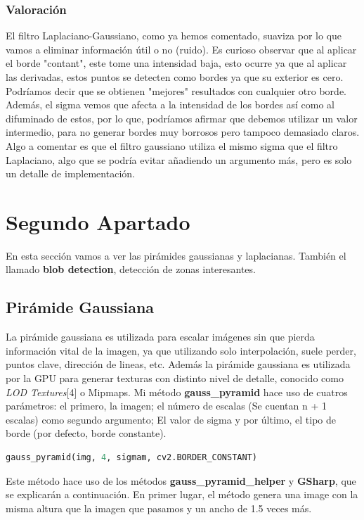 \documentclass{article}
\begin{document}
\newpage

\subsubsection{Valoración}
El filtro Laplaciano-Gaussiano, como ya hemos comentado, suaviza por lo que vamos a eliminar información útil o no (ruido).
\newline
\newline
Es curioso observar que al aplicar el borde "contant", este tome una intensidad baja, esto ocurre ya que al aplicar las derivadas, estos puntos se detecten como bordes ya que su exterior es cero. Podríamos decir que se obtienen "mejores" resultados con cualquier otro borde.
\newline
\newline
Además, el sigma vemos que afecta a la intensidad de los bordes así como al difuminado de estos, por lo que, podríamos afirmar que debemos utilizar un valor intermedio, para no generar bordes muy borrosos pero tampoco demasiado claros.
\newline
\newline
Algo a comentar es que el filtro gaussiano utiliza el mismo sigma que el filtro Laplaciano, algo que se podría evitar añadiendo un argumento más, pero es solo un detalle de implementación.

\newpage

\section{Segundo Apartado}
En esta sección vamos a ver las pirámides gaussianas y laplacianas. También el llamado \textbf{blob detection}, detección de zonas interesantes.

\subsection{Pirámide Gaussiana}
La pirámide gaussiana es utilizada para escalar imágenes sin que pierda información vital de la imagen, ya que utilizando solo interpolación, suele perder, puntos clave, dirección de lineas, etc.
\newline
\newline
Además la pirámide gaussiana es utilizada por la GPU para generar texturas con distinto nivel de detalle, conocido como \textit{LOD Textures}[4] o Mipmaps.
\newline
\newline
Mi método \textbf{gauss\_pyramid} hace uso de cuatros parámetros: el primero, la imagen; el número de escalas (Se cuentan n + 1 escalas) como segundo argumento; El valor de sigma y por último, el tipo de borde (por defecto, borde constante).
\begin{lstlisting}[language=Python]
	gauss_pyramid(img, 4, sigmam, cv2.BORDER_CONSTANT)
\end{lstlisting}
Este método hace uso de los métodos \textbf{gauss\_pyramid\_helper} y \textbf{GSharp}, que se explicarán a continuación. En primer lugar, el método genera una image con la misma altura que la imagen que pasamos y un ancho de 1.5 veces más.
\end{document}
